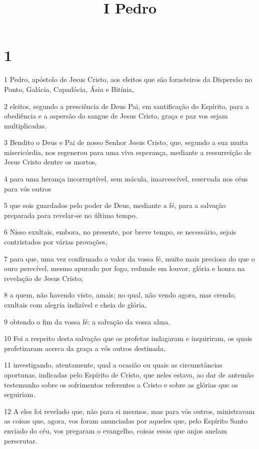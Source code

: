 

\title{I Pedro}


\chapter{1}

\par 1 Pedro, apóstolo de Jesus Cristo, aos eleitos que são forasteiros da Dispersão no Ponto, Galácia, Capadócia, Ásia e Bitínia,
\par 2 eleitos, segundo a presciência de Deus Pai, em santificação do Espírito, para a obediência e a aspersão do sangue de Jesus Cristo, graça e paz vos sejam multiplicadas.
\par 3 Bendito o Deus e Pai de nosso Senhor Jesus Cristo, que, segundo a sua muita misericórdia, nos regenerou para uma viva esperança, mediante a ressurreição de Jesus Cristo dentre os mortos,
\par 4 para uma herança incorruptível, sem mácula, imarcescível, reservada nos céus para vós outros
\par 5 que sois guardados pelo poder de Deus, mediante a fé, para a salvação preparada para revelar-se no último tempo.
\par 6 Nisso exultais, embora, no presente, por breve tempo, se necessário, sejais contristados por várias provações,
\par 7 para que, uma vez confirmado o valor da vossa fé, muito mais preciosa do que o ouro perecível, mesmo apurado por fogo, redunde em louvor, glória e honra na revelação de Jesus Cristo;
\par 8 a quem, não havendo visto, amais; no qual, não vendo agora, mas crendo, exultais com alegria indizível e cheia de glória,
\par 9 obtendo o fim da vossa fé: a salvação da vossa alma.
\par 10 Foi a respeito desta salvação que os profetas indagaram e inquiriram, os quais profetizaram acerca da graça a vós outros destinada,
\par 11 investigando, atentamente, qual a ocasião ou quais as circunstâncias oportunas, indicadas pelo Espírito de Cristo, que neles estava, ao dar de antemão testemunho sobre os sofrimentos referentes a Cristo e sobre as glórias que os seguiriam.
\par 12 A eles foi revelado que, não para si mesmos, mas para vós outros, ministravam as coisas que, agora, vos foram anunciadas por aqueles que, pelo Espírito Santo enviado do céu, vos pregaram o evangelho, coisas essas que anjos anelam perscrutar.
